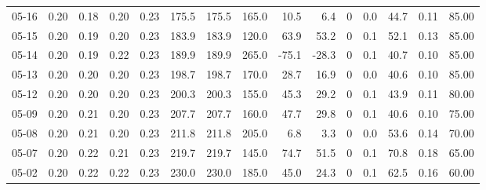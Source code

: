 \begin{threeparttable}
{\begin{tabular}{lrrrrrrrrrrrrrr}
  05-16 &          0.20 &          0.18 &          0.20 &        0.23 &               175.5 &              175.5 &               165.0 &       10.5 &          6.4 &              0 &                 0.0 &             44.7 &            0.11 &                  85.00 \\
  05-15 &          0.20 &          0.19 &          0.20 &        0.23 &               183.9 &              183.9 &               120.0 &       63.9 &         53.2 &              0 &                 0.1 &             52.1 &            0.13 &                  85.00 \\
  05-14 &          0.20 &          0.19 &          0.22 &        0.23 &               189.9 &              189.9 &               265.0 &      -75.1 &        -28.3 &              0 &                 0.1 &             40.7 &            0.10 &                  85.00 \\
  05-13 &          0.20 &          0.20 &          0.20 &        0.23 &               198.7 &              198.7 &               170.0 &       28.7 &         16.9 &              0 &                 0.0 &             40.6 &            0.10 &                  85.00 \\
  05-12 &          0.20 &          0.20 &          0.20 &        0.23 &               200.3 &              200.3 &               155.0 &       45.3 &         29.2 &              0 &                 0.1 &             43.9 &            0.11 &                  80.00 \\
  05-09 &          0.20 &          0.21 &          0.20 &        0.23 &               207.7 &              207.7 &               160.0 &       47.7 &         29.8 &              0 &                 0.1 &             40.6 &            0.10 &                  75.00 \\
  05-08 &          0.20 &          0.21 &          0.20 &        0.23 &               211.8 &              211.8 &               205.0 &        6.8 &          3.3 &              0 &                 0.0 &             53.6 &            0.14 &                  70.00 \\
  05-07 &          0.20 &          0.22 &          0.21 &        0.23 &               219.7 &              219.7 &               145.0 &       74.7 &         51.5 &              0 &                 0.1 &             70.8 &            0.18 &                  65.00 \\
  05-02 &          0.20 &          0.22 &          0.22 &        0.23 &               230.0 &              230.0 &               185.0 &       45.0 &         24.3 &              0 &                 0.1 &             62.5 &            0.16 &                  60.00 \\

\end{tabular}}
\end{threeparttable}
